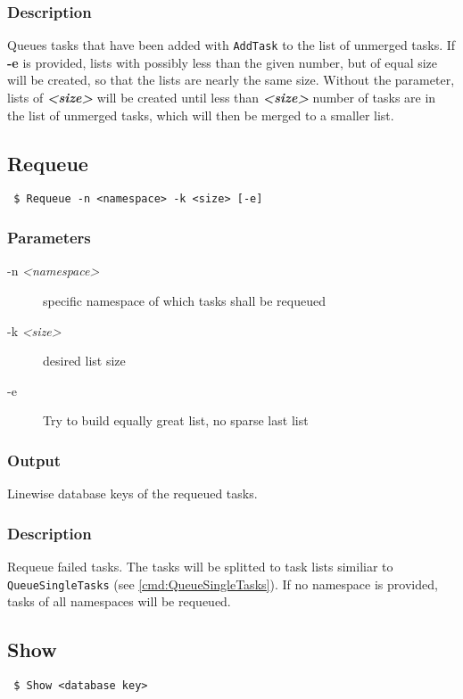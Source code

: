 \documentclass[a4paper,11pt]{article}
\begin{document}
\subsubsection{Description}
Queues tasks that have been added with \texttt{AddTask} to the list of unmerged tasks. If \textbf{-e} is provided, lists with possibly less than the given number, but of equal size will be created, so that the lists are nearly the same size. Without the parameter, lists of \textbf{\textit{<size>}} will be created until less than \textbf{\textit{<size>}} number of tasks are in the list of unmerged tasks, which will then be merged to a smaller list.


\newpage


\subsection{Requeue\label{cmd:Requeue}}
\begin{verbatim}
 $ Requeue -n <namespace> -k <size> [-e]
\end{verbatim}

\subsubsection{Parameters}
\begin{description}
\item[-n \textit{<namespace>}] specific namespace of which tasks shall be requeued
\item[-k \textit{<size>}] desired list size
\item[-e] Try to build equally great list, no sparse last list
\end{description}

\subsubsection{Output}
Linewise database keys of the requeued tasks.

\subsubsection{Description}
Requeue failed tasks. The tasks will be splitted to task lists similiar to \texttt{QueueSingleTasks} (see \ref{cmd:QueueSingleTasks}). If no namespace is provided, tasks of all namespaces will be requeued.

\newpage

\subsection{Show\label{cmd:Show}}
\begin{verbatim}
 $ Show <database key>
\end{verbatim}
\end{document}
